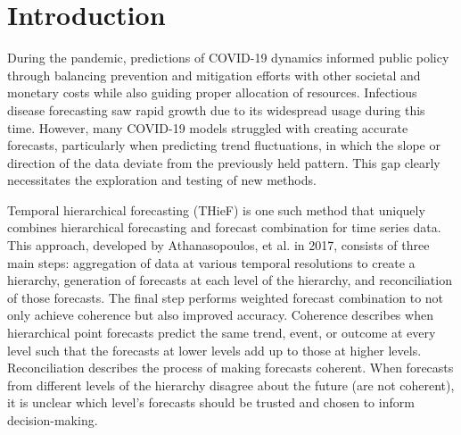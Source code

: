 \documentclass[12pt]{article}
\begin{document}




\section{Introduction} \label{introduction}
During the pandemic, predictions of COVID-19 dynamics informed public policy through balancing prevention and mitigation efforts with other societal and monetary costs while also guiding proper allocation of resources\cite{disease_economics}. Infectious disease forecasting saw rapid growth due to its widespread usage during this time. However, many COVID-19 models struggled with creating accurate forecasts, particularly when predicting trend fluctuations, in which the slope or direction of the data deviate from the previously held pattern\cite{cramer}. This gap clearly necessitates the exploration and testing of new methods.

Temporal hierarchical forecasting (THieF) is one such method that uniquely combines hierarchical forecasting and forecast combination for time series data. This approach, developed by Athanasopoulos, et al. in 2017, consists of three main steps: aggregation of data at various temporal resolutions to create a hierarchy, generation of forecasts at each level of the hierarchy, and reconciliation of those forecasts. The final step performs weighted forecast combination to not only achieve coherence but also improved accuracy\cite{thief}. Coherence describes when hierarchical point forecasts predict the same trend, event, or outcome at every level such that the forecasts at lower levels add up to those at higher levels. Reconciliation describes the process of making forecasts coherent. When forecasts from different levels of the hierarchy disagree about the future (are not coherent), it is unclear which level's forecasts should be trusted and chosen to inform decision-making\cite{hts_talk}.
\end{document}
